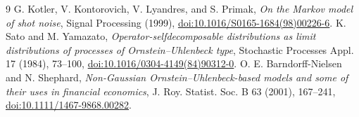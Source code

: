 \documentclass[10pt]{article}
\begin{document}
\begin{thebibliography}{9}
G. Kotler, V. Kontorovich, V. Lyandres, and S. Primak,
\emph{On the Markov model of shot noise}, Signal Processing (1999),
\href{https://doi.org/10.1016/S0165-1684(98)00226-6}{doi:10.1016/S0165-1684(98)00226-6}.
K. Sato and M. Yamazato, \emph{Operator-selfdecomposable distributions as
limit distributions of processes of Ornstein--Uhlenbeck type}, Stochastic
Processes Appl. 17 (1984), 73--100,
\href{https://doi.org/10.1016/0304-4149(84)90312-0}{doi:10.1016/0304-4149(84)90312-0}.
O. E. Barndorff-Nielsen and N. Shephard, \emph{Non-Gaussian
Ornstein--Uhlenbeck-based models and some of their uses in financial
economics}, J. Roy. Statist. Soc. B 63 (2001), 167--241,
\href{https://doi.org/10.1111/1467-9868.00282}{doi:10.1111/1467-9868.00282}.
\end{thebibliography}
\end{document}
